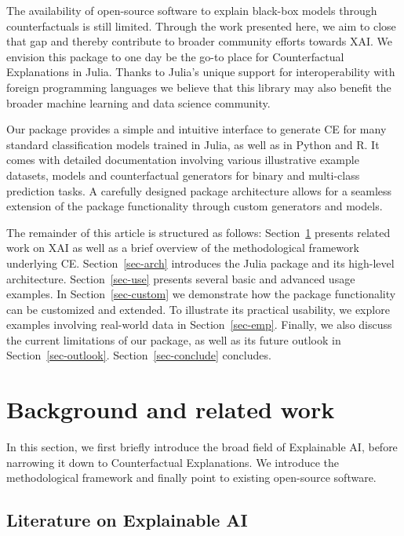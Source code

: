 \documentclass[
  letterpaper,
  DIV=11,
  numbers=noendperiod]{scrartcl}
\begin{document}
The availability of open-source software to explain black-box models
through counterfactuals is still limited. Through the work presented
here, we aim to close that gap and thereby contribute to broader
community efforts towards XAI. We envision this package to one day be
the go-to place for Counterfactual Explanations in Julia. Thanks to
Julia's unique support for interoperability with foreign programming
languages we believe that this library may also benefit the broader
machine learning and data science community.

Our package provides a simple and intuitive interface to generate CE for
many standard classification models trained in Julia, as well as in
Python and R. It comes with detailed documentation involving various
illustrative example datasets, models and counterfactual generators for
binary and multi-class prediction tasks. A carefully designed package
architecture allows for a seamless extension of the package
functionality through custom generators and models.

The remainder of this article is structured as follows:
Section~\ref{sec-related} presents related work on XAI as well as a
brief overview of the methodological framework underlying CE.
Section~\ref{sec-arch} introduces the Julia package and its high-level
architecture. Section~\ref{sec-use} presents several basic and advanced
usage examples. In Section~\ref{sec-custom} we demonstrate how the
package functionality can be customized and extended. To illustrate its
practical usability, we explore examples involving real-world data in
Section~\ref{sec-emp}. Finally, we also discuss the current limitations
of our package, as well as its future outlook in
Section~\ref{sec-outlook}. Section~\ref{sec-conclude} concludes.

\hypertarget{sec-related}{%
\section{Background and related work}\label{sec-related}}

In this section, we first briefly introduce the broad field of
Explainable AI, before narrowing it down to Counterfactual Explanations.
We introduce the methodological framework and finally point to existing
open-source software.

\hypertarget{literature-on-explainable-ai}{%
\subsection{Literature on Explainable
AI}\label{literature-on-explainable-ai}}
\end{document}
